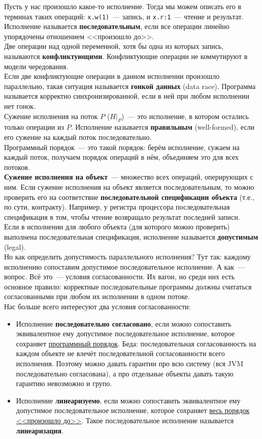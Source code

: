 \documentclass{article}
\begin{document}
Пусть у нас произошло какое-то исполнение. Тогда мы можем описать его в терминах таких операций: \Verb|x.w(1)|~--- запись, и \Verb|x.r:1|~--- чтение и результат.\\
Исполнение называется \textbf{последовательным}, если все операции линейно упорядочены отношением <<произошло до>>.\\
Две операции над одной переменной, хотя бы одна из которых запись, называются \textbf{конфликтующими}. Конфликтующие операции не коммутируют в модели чередования.\\
Если две конфликтующие операции в данном исполнении произошло параллельно, такая ситуация называется \textbf{гонкой данных} (data race). Программа называется корректно синхронизированной, если в ней при любом исполнении нет гонок.\\
Сужение исполнения на поток $P$ ($H\big|_P$)~--- это исполнение, в котором остались только операции из $P$. Исполнение называется \textbf{правильным} (well-formed), если его сужение на каждый поток последовательно.\\
Программный порядок~--- это такой порядок: берём исполнение, сужаем на каждый поток, получаем порядок операций в нём, объединяем это для всех потоков.\\
\textbf{Сужение исполнения на объект}~--- множество всех операций, оперирующих с ним. Если сужение исполнения на объект является последовательным, то можно проверить его на соответствие \textbf{последовательной спецификации объекта} (т.е., по сути, контракту). Например, у регистра процессора последовательная спецификация в том, чтобы чтение возвращало результат последней записи.\\
Если в исполнении для любого объекта (для которого можно проверить) выполнена последовательная спецификация, исполнение называется \textbf{допустимым} (legal).\\
Но как определить допустимость параллельного исполнения? Тут так: каждому исполнению сопоставим допустимое последовательное исполнение. А как~--- вопрос. Всё это~--- условия согласованности. Их вагон, но среди них есть основное правило: корректные последовательные программы должны считаться согласованными при любом их исполнении в одном потоке.\\
Нас больше всего интересуют два условия согласованности:
\begin{itemize}
    \item Исполнение \textbf{последовательно согласовано}, если можно сопоставить эквивалентное ему допустимое последовательное исполнение, которое сохраняет \underline{программный порядок}. Беда: последовательная согласованность на каждом объекте не влечёт последовательной согласованности всего исполнения. Поэтому можно давать гарантии про всю систему (вся JVM последовательно согласована), а про отдельные объекты давать такую гарантию невозможно и групо.
    \item Исполнение \textbf{линеаризуемо}, если можно сопоставить эквивалентное ему допустимое последовательное исполнение, которое сохраняет \underline{весь порядок <<произошло до>>}. Такое последовательное исполнение называется \textbf{линеаризация}.
\end{itemize}
\end{document}
